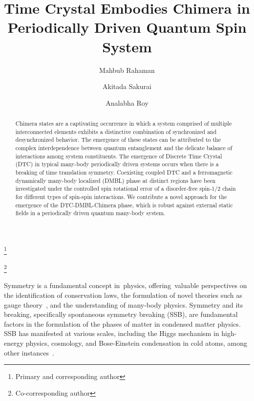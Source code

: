 \documentclass[%
nofootinbib,
reprint,
superscriptaddress,
amsmath,amssymb,showkeys,
aps,
prb,
]{revtex4-2}
\begin{document}
	
	\title{Time Crystal Embodies Chimera in Periodically Driven Quantum Spin System}
	
	\author{Mahbub Rahaman}
	\thanks{Primary and corresponding author}
	\author{Akitada Sakurai}
	\author{Analabha Roy}
	\thanks{Co-corresponding author}
	
	\begin{abstract}
		Chimera states are a captivating occurrence in which a system comprised of multiple interconnected elements exhibits a distinctive combination of synchronized and desynchronized behavior. The emergence of these states can be attributed to the complex interdependence between quantum entanglement and the delicate balance of interactions among system constituents. The emergence of Discrete Time Crystal (DTC) in typical many-body periodically driven systems occurs when there is a breaking of time translation symmetry. Coexisting coupled DTC and a ferromagnetic dynamically many-body localized (DMBL) phase at distinct regions have been investigated under the controlled spin rotational error of a disorder-free spin-1/2 chain for different types of spin-spin interactions. We contribute a novel approach for the emergence of the DTC-DMBL-Chimera phase, which is robust against external static fields in a periodically driven quantum many-body system.
	\end{abstract}
	
	\maketitle
	
	Symmetry is a fundamental concept in physics, offering valuable perspectives on the identification of conservation laws, the formulation of novel theories such as gauge theory~\cite{Yang_1954}, and the understanding of many-body physics. Symmetry and its breaking, specifically spontaneous symmetry breaking (SSB), are fundamental factors in the formulation of the phases of matter in condensed matter physics. SSB has manifested at various scales, including the Higgs mechanism in high-energy physics, cosmology, and  Bose-Einstein condensation  in cold atoms, among other instances~\cite{krasnov_spontaneous_2012, sadler_spontaneous_2006, vanderbruggen_spontaneous_2015}.
\end{document}
